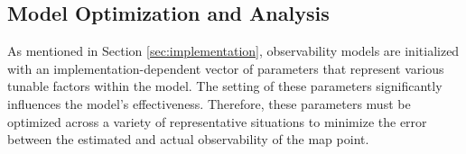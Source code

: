 \subsection{Model Optimization and Analysis}

As mentioned in Section \ref{sec:implementation}, observability models are initialized with an implementation-dependent vector of parameters that represent various tunable factors within the model. The setting of these parameters significantly influences the model's effectiveness. Therefore, these parameters must be optimized across a variety of representative situations to minimize the error between the estimated and actual observability of the map point. 

\subsubsection{}